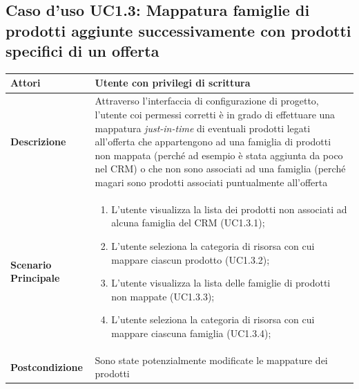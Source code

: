 \documentclass[12pt,a4paper,twoside,openright,english]{book}
\begin{document}
\begin{small}
	\subsection{Caso d'uso UC1.3: Mappatura famiglie di prodotti aggiunte successivamente con prodotti specifici di un offerta}
	\begin{longtable}{ | p{2.7cm} | p{12cm} |}
		\hline \textbf{Attori} & Utente con privilegi di scrittura\\ 
		\hline \textbf{Descrizione} & Attraverso l’interfaccia di configurazione di progetto, l’utente coi permessi corretti è in grado di effettuare una mappatura \textit{just-in-time} di eventuali prodotti legati all’offerta che appartengono ad una famiglia di prodotti non mappata (perché ad esempio è stata aggiunta da poco nel CRM) o che non sono associati ad una famiglia (perché magari sono prodotti associati puntualmente all’offerta\\ 
		\hline \textbf{Scenario Principale} & \begin{enumerate}
			\item L’utente visualizza la lista dei prodotti non associati ad alcuna famiglia del CRM  (UC1.3.1);
			\item L’utente seleziona la categoria di risorsa con cui mappare ciascun prodotto  (UC1.3.2);
			\item L’utente visualizza la lista delle famiglie di prodotti non mappate  (UC1.3.3);
			\item L’utente seleziona la categoria di risorsa con cui mappare ciascuna famiglia  (UC1.3.4);
			
		\end{enumerate}
		\\ 
		\hline \textbf{Postcondizione} & Sono state potenzialmente modificate le mappature dei prodotti\\ 
		\hline 
	\end{longtable}
	
	\hypertarget{UC2}{}

\end{small}
\end{document}
